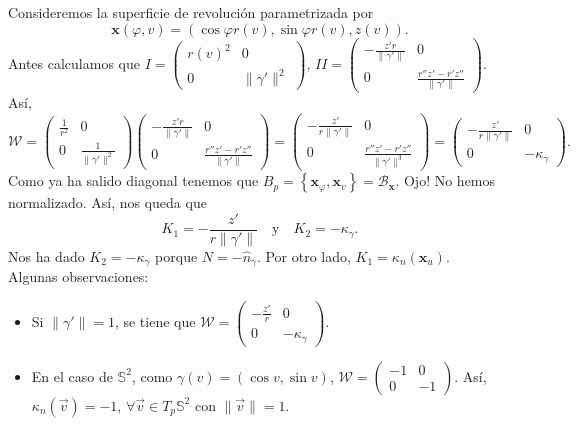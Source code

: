 \begin{eg}
Consideremos la superficie de revolución parametrizada por
\[ \textbf{x} \left(\varphi, v\right)=\left(\cos \varphi r\left(v\right), \sin \varphi r\left(v\right), z\left(v\right)\right) .\]
Antes calculamos que $\displaystyle I = \begin{pmatrix} r\left(v\right)^{2} & 0 \\ 0 & \|\gamma'\|^{2} \end{pmatrix} $, $\displaystyle II = \begin{pmatrix} -\frac{z'r}{\|\gamma'\|}& 0 \\ 0 & \frac{r''z'-r'z''}{\|\gamma'\|} \end{pmatrix} $. Así, 
\[\mathcal{W} = \begin{pmatrix} \frac{1}{r^{2}} & 0 \\ 0 & \frac{1}{\|\gamma'\|^{2}} \end{pmatrix}\begin{pmatrix} -\frac{z'r}{\|\gamma'\|}& 0 \\ 0 & \frac{r''z'-r'z''}{\|\gamma'\|} \end{pmatrix} = \begin{pmatrix} -\frac{z'}{r\|\gamma'\|} & 0 \\ 0 & \frac{r''z'-r'z''}{\|\gamma'\|^{3}} \end{pmatrix} = \begin{pmatrix} -\frac{z'}{r\|\gamma'\|} & 0 \\ 0 & -\kappa_{\gamma} \end{pmatrix}.\]
Como ya ha salido diagonal tenemos que $\displaystyle B_{p}= \left\{ \textbf{x} _{\varphi}, \textbf{x} _{v}\right\} =\mathcal{B}_{ \textbf{x} } $. Ojo! No hemos normalizado. Así, nos queda que
\[K_{1}=-\frac{z'}{r\|\gamma'\|}\quad \text{y} \quad K_{2}=-\kappa_{\gamma } .\]
Nos ha dado $\displaystyle K_{2}=-\kappa_{\gamma } $ porque $\displaystyle N =-\hat{n}_{\gamma } $. Por otro lado, $\displaystyle K_{1}=\kappa_{n}\left( \textbf{x} _{u}\right) $. \\
Algunas observaciones:
\begin{itemize}
	\item Si $\displaystyle \|\gamma'\|=1 $, se tiene que $\displaystyle \mathcal{W}=\begin{pmatrix} -\frac{z'}{r} & 0 \\ 0 & -\kappa_{\gamma } \end{pmatrix} $.
	\item En el caso de $\displaystyle \mathbb{S}^{2} $, como $\displaystyle \gamma\left(v\right)=\left(\cos v, \sin v\right) $, $\displaystyle \mathcal{W}=\begin{pmatrix} -1 & 0 \\ 0 & - 1 \end{pmatrix} $. Así, $\displaystyle \kappa_{n}\left(\vec{v}\right)=-1 $, $\displaystyle \forall \vec{v}\in T_{p}\mathbb{S}^{2} $ con $\displaystyle \|\vec{v}\| = 1 $. 
\end{itemize}
\end{eg}
